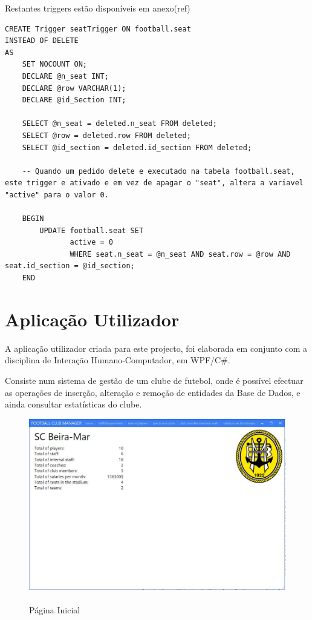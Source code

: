 \documentclass[pdftex,12pt,a4paper]{report}
\begin{document}
Restantes triggers estão disponíveis em anexo(ref)
\\

\begin{lstlisting}
CREATE Trigger seatTrigger ON football.seat
INSTEAD OF DELETE
AS
	SET NOCOUNT ON;
	DECLARE @n_seat INT;
	DECLARE @row VARCHAR(1);
	DECLARE @id_Section INT;

	SELECT @n_seat = deleted.n_seat FROM deleted;
	SELECT @row = deleted.row FROM deleted;
	SELECT @id_section = deleted.id_section FROM deleted;
	
	-- Quando um pedido delete e executado na tabela football.seat, este trigger e ativado e em vez de apagar o "seat", altera a variavel "active" para o valor 0.
	
	BEGIN
		UPDATE football.seat SET
			   active = 0
			   WHERE seat.n_seat = @n_seat AND seat.row = @row AND seat.id_section = @id_section;
	END
\end{lstlisting}
 \vspace{0,5in}

\newpage
\section{Aplicação Utilizador}
A aplicação utilizador criada para este projecto, foi elaborada em conjunto com a disciplina de Interação Humano-Computador, em WPF/C\#.

Consiste num sistema de gestão de um clube de futebol, onde é possível efectuar as operações de inserção, alteração e remoção de entidades da Base de Dados, e ainda consultar estatísticas do clube.
\\

\begin{figure}[!htb]
 \includegraphics[width=135mm,scale=1]{app_home_page.jpg}
 \caption{\\Página Inicial}\label{fig:eer}
\end{figure}
\end{document}

